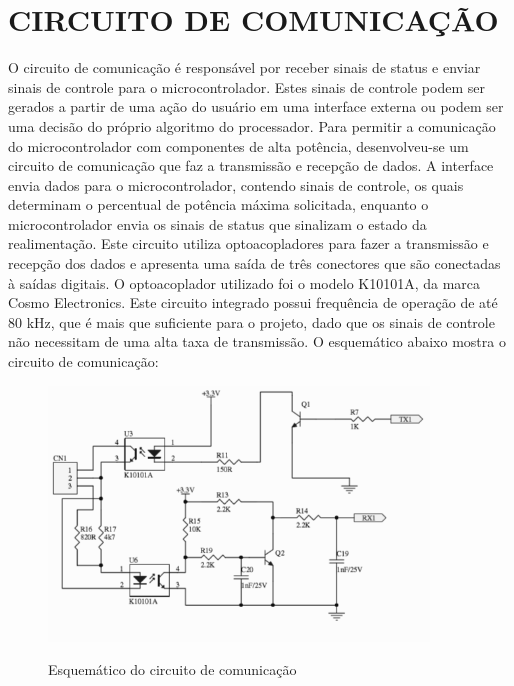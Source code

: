 \section{CIRCUITO DE COMUNICAÇÃO}
\label{sec:commCircuit}
O circuito de comunicação é responsável por receber sinais de status e enviar sinais de controle para o microcontrolador. Estes sinais de controle podem ser gerados a partir de uma ação do usuário em uma interface externa ou podem ser uma decisão do próprio algoritmo do processador. Para permitir a comunicação do microcontrolador com componentes de alta potência, desenvolveu-se um circuito de comunicação que faz a transmissão e recepção de dados. A interface envia dados para o microcontrolador, contendo sinais de controle, os quais determinam o percentual de potência máxima solicitada, enquanto o microcontrolador envia os sinais de status que sinalizam o estado da realimentação. Este circuito utiliza optoacopladores para fazer a transmissão e recepção dos dados e apresenta uma saída de três conectores que são conectadas à saídas digitais. O  optoacoplador utilizado foi o modelo K10101A, da marca Cosmo Electronics. Este circuito integrado possui frequência de operação de até 80 kHz, que é mais que suficiente para o projeto, dado que os sinais de controle não necessitam de uma alta taxa de transmissão. O esquemático abaixo mostra o circuito de comunicação:

\begin{figure}[H]
    \centering
    \caption{Esquemático do circuito de comunicação}
    \includegraphics[width=0.9\textwidth]{./dados/figuras/proj-comm}
    \label{fig:figura-comm}
\end{figure}



